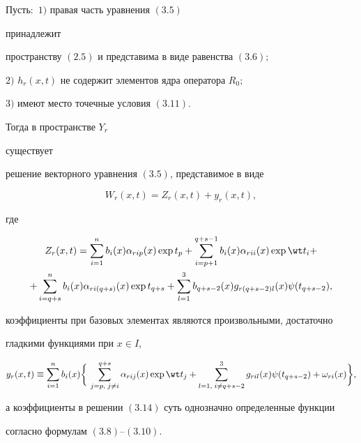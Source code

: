 \begin{thm} Пусть$:$ $1)$ правая часть уравнения $(3.5)$ 


принадлежит 


пространству $(2.5)$ и представима в виде равенства $(3.6);$ 


 


$2)$ $h_r(x,t)$ не содержит элементов ядра оператора $R_0;$ 


 


$3)$ имеют место точечные условия $(3.11)$. 


 


Тогда в пространстве $Y_r$ 


существует 


решение векторного уравнения $(3.5)$, представимое в виде 


\begin{equation} 


W_r(x,t)=Z_r(x,t)+y_r(x,t), 


\end{equation} 


где 


\begin{multline} 


Z_r(x,t)=\sum^n_{i=1}b_i(x)\alpha_{rip}(x)\exp t_p+ 


\sum^{q+s-1}_{i=p+1}b_i(x)\alpha_{rii}(x)\exp\wt t_i+ \\ 


% 


+\sum^n_{i=q+s}b_i(x)\alpha_{ri(q+s)}(x)\exp t_{q+s}+ 


\sum^3_{l=1}b_{q+s-2}(x)g_{r(q+s-2)l}(x) 


\psi(t_{q+s-2}), 


\end{multline} 


коэффициенты при базовых элементах являются произвольными, достаточно 


гладкими функциями при $x\in I$, 


\begin{equation} 


y_r(x,t)\equiv\sum^n_{i=1}b_i(x)\bigg\{\, 


\sum^{q+s}_{j=p,\;j\ne i}\alpha_{rij}(x)\exp\wt t_j+ 


\sum^3_{l=1,\;i\ne q+s-2}g_{ril}(x)\psi(t_{q+s-2}) 


+\omega_{ri}(x)\bigg\}, 


\end{equation} 


а коэффициенты в решении $(3.14)$ суть однозначно определенные функции 


согласно формулам $(3.8)$--$(3.10)$. 


\end{thm} 



